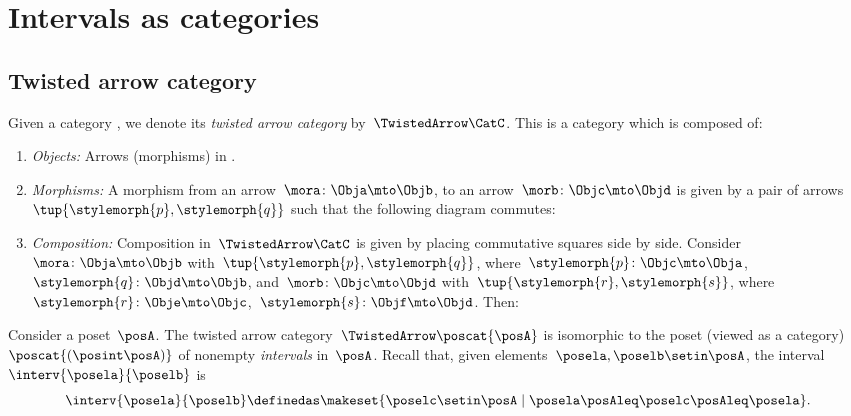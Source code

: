 
\section{Intervals as categories}

\subsection{Twisted arrow category}

\begin{ctdefinition}
    \label{def:twisted-arrow-category}
    \label{def:twisted-arrow}
    Given a category \CatC, we denote its \emph{twisted arrow category} by~$\TwistedArrow\CatC$.
    This is a category which is composed of:
    \begin{enumerate}
        \item \emph{Objects:} Arrows (morphisms) in \CatC.
        \item \emph{Morphisms:}
              A morphism from an arrow~$\mora\colon \Obja \mto \Objb $, to an arrow~$\morb\colon \Objc \mto \Objd$ is given by a pair of arrows~$\tup{\stylemorph{p},\stylemorph{q}}$ such that the following diagram commutes:
        \item \emph{Composition:} Composition in~$\TwistedArrow\CatC$ is given by placing commutative squares side by side.
              Consider~$\mora\colon \Obja \mto \Objb$ with~$\tup{\stylemorph{p},\stylemorph{q}}$, where~$\stylemorph{p}\colon \Objc\mto \Obja$,~$\stylemorph{q}\colon \Objd \mto \Objb$, and~$\morb\colon \Objc \mto \Objd$ with~$\tup{\stylemorph{r},\stylemorph{s}}$, where~$\stylemorph{r}\colon \Obje\mto \Objc$,~$\stylemorph{s}\colon \Objf \mto \Objd$.
              Then:
    \end{enumerate}
\end{ctdefinition}


\begin{example}[Intervals]
    \label{exa:twisted-arrow-poset}
    Consider a poset~$\posA$.
    The twisted arrow category~$\TwistedArrow \poscat{\posA}$ is isomorphic to the poset (viewed as a category)~$\poscat{\left(\posint\posA\right)}$ of nonempty \emph{intervals} in~$\posA$.
    Recall that, given elements~$\posela, \poselb \setin \posA$, the interval~$\interv{\posela}{\poselb}$ is
    \begin{equation}
        \interv{\posela}{\poselb}
        \definedas \makeset{\poselc \setin \posA \mid \posela\posAleq \poselc \posAleq \posela}.
    \end{equation}
\end{example}

